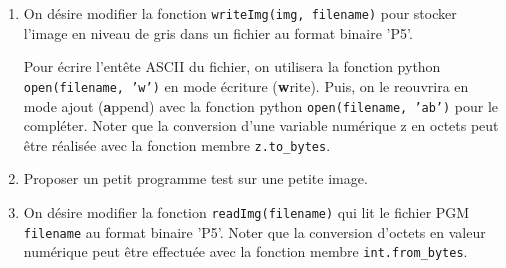 \documentclass[a4paper, 10pt]{article}
\begin{document}
\begin{enumerate} 

\item On désire modifier la fonction   {\tt writeImg(img, filename)}  pour stocker l'image en niveau de gris 
dans un fichier au format binaire 'P5'. 

Pour écrire l'entête ASCII du fichier, on utilisera la fonction python
{\tt open(filename, 'w')} en mode écriture ({\bf w}rite). Puis,  on le reouvrira en mode ajout ({\bf a}ppend) avec la fonction python
{\tt open(filename, 'ab')} pour le compléter. Noter que la conversion d'une variable numérique z en octets peut être
réalisée avec la fonction membre {\tt z.to\_bytes}.

\item Proposer un petit programme test sur une petite image. 

\item On désire modifier la fonction {\tt readImg(filename)} qui lit  le fichier PGM {\tt filename}
au format binaire 'P5'. Noter que la conversion d'octets en valeur numérique peut être effectuée avec la fonction
membre  {\tt int.from\_bytes}.

\end{enumerate}
\end{document}
